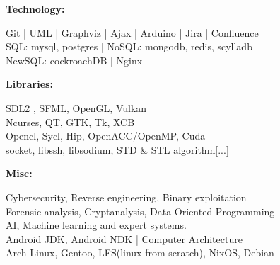 \documentclass[a4paper,10pt]{article}
\begin{document}
\begin{adjustbox}{valign=t}
\begin{minipage}{0.6\textwidth}
\begin{description}
\begin{spacing}{0.85}
\item{\textbf{Technology:}}

    Git | UML | Graphviz | Ajax | Arduino | Jira | Confluence\\
    SQL: mysql, postgres | NoSQL: mongodb, redis, scylladb\\
    NewSQL: cockroachDB | Nginx

\item{\textbf{Libraries:}}

    SDL2 , SFML, OpenGL, Vulkan\\
    Ncurses, QT, GTK, Tk, XCB\\
    Opencl, Sycl, Hip, OpenACC/OpenMP, Cuda\\
    socket, libssh, libsodium, STD \& STL algorithm{[...]}

\item{\textbf{Misc:}}

    Cybersecurity, Reverse engineering, Binary exploitation\\
    Forensic analysis, Cryptanalysis, Data Oriented Programming\\
    AI, Machine learning and expert systems.\\
    Android JDK, Android NDK | Computer Architecture\\
    Arch Linux, Gentoo, LFS(linux from scratch), NixOS, Debian

\vspace{-2.2\baselineskip}
\end{spacing}
\end{description}







\end{minipage}
\end{adjustbox}
\end{document}
